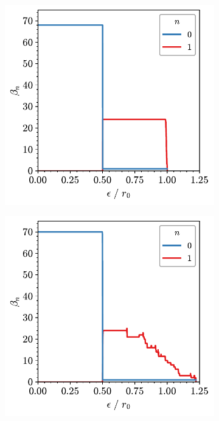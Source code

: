 \begin{figure}[tbp]
     \begin{subfigure}[b]{0.45\textwidth}
         \centering
         \includegraphics[width=\textwidth]{./figures/ph/ex_c_betti.pdf}
         \caption{}
         \label{fig:exvisc}
     \end{subfigure}
     \hfill
     \begin{subfigure}[b]{0.45\textwidth}
         \centering
         \includegraphics[width=\textwidth]{./figures/ph/ex_a_betti.pdf}
         \caption{}
         \label{fig:exvisd}
     \end{subfigure}
     \hfill
     

\end{figure}
